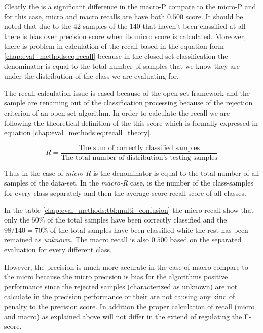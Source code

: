 Clearly the is a significant difference in the macro-P compare to the micro-P and for this case, micro and macro recalls are have both $0.500$ score. It should be noted that due to the 42 samples of the 140 that haven't been classified at all there is bias over precision score when its micro score is calculated. Moreover, there is problem in calculation of the recall based in the equation form \ref{chap:eval_methods:eq:recall} because in the closed set classification the denominator is equal to the total number pf samples that we know they are under the distribution of the class we are evaluating for. 

The recall calculation issue is cased because of the open-set framework and the sample are renaming out of the classification processing because of the rejection criterion of an open-set algorithm. In order to calculate the recall we are following the theoretical definition of the this score which is formally expressed in equation \ref{chap:eval_methods:eq:recall_theory}.

\begin{equation}\label{chap:eval_methods:eq:recall_theory}
	R = \frac {\text{The sum of correctly classified samples}} {\text{The total number of distribution's testing samples}}
\end{equation}

Thus in the case of \textit{micro-R} is the denominator is equal to the total number of all samples of the data-set. In the \textit{macro-R} case, is the number of the class-samples for every class separately and then the average score recall score of all classes.

In the table \ref{chap:eval_methods:tbl:multi_confusion} the micro recall show that only the $50\%$ of the total samples have been correctly classified and the $98/140 = 70\%$ of the total samples have been classified while the rest has been remained as \textit{unknown}. The macro recall is also $0.500$ based on the separated evaluation for every different class.

However, the precision is much more accurate in the case of macro compare to the micro because the micro precision is bias for the algorithms positive performance since the rejected samples (characterized as unknown) are not calculate in the precision performance or their are not causing any kind of penalty to the precision score. In addition the proper calculation of recall (micro and macro) as explained above will not differ in the extend of regulating the F-score.


